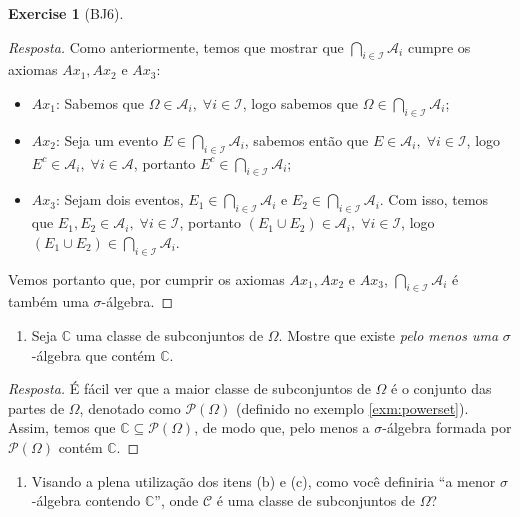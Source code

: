 \documentclass[
]{article}
\providecommand{\tightlist}{%
  \setlength{\itemsep}{0pt}\setlength{\parskip}{0pt}}
\theoremstyle{definition}
\theoremstyle{definition}
\theoremstyle{definition}
\newtheorem{exercise}{Exercise}[section]
\theoremstyle{definition}
\theoremstyle{remark}
\begin{document}
\begin{exercise}[BJ6]
\begin{proof}[Resposta]
Como anteriormente, temos que mostrar que \(\bigcap_{i \in \mathcal{I}}\mathcal{A}_{i}\) cumpre os axiomas \(Ax_{1}, Ax_{2}\) e \(Ax_{3}\):

\begin{itemize}
\tightlist
\item
  \(Ax_{1}\): Sabemos que \(\Omega \in \mathcal{A}_{i}, \; \forall i \in \mathcal{I}\), logo sabemos que \(\Omega \in \bigcap_{i \in \mathcal{I}}\mathcal{A}_{i}\);
\item
  \(Ax_{2}\): Seja um evento \(E \in \bigcap_{i \in \mathcal{I}}\mathcal{A}_{i}\), sabemos então que \(E \in \mathcal{A}_{i}, \; \forall i \in \mathcal{I}\), logo \(E^{c} \in \mathcal{A}_{i}, \; \forall i \in \mathcal{A}\), portanto \(E^{c} \in \bigcap_{i \in \mathcal{I}}\mathcal{A}_{i}\);
\item
  \(Ax_{3}\): Sejam dois eventos, \(E_{1} \in \bigcap_{i \in \mathcal{I}}\mathcal{A}_{i}\) e \(E_{2} \in \bigcap_{i \in \mathcal{I}}\mathcal{A}_{i}\). Com isso, temos que \(E_{1}, E_{2} \in \mathcal{A}_{i}, \; \forall i \in \mathcal{I}\), portanto \((E_{1} \cup E_{2}) \in \mathcal{A}_{i}, \; \forall i \in \mathcal{I}\), logo \((E_{1} \cup E_{2}) \in \bigcap_{i \in \mathcal{I}}\mathcal{A}_{i}\).
\end{itemize}

Vemos portanto que, por cumprir os axiomas \(Ax_{1}, Ax_{2}\) e \(Ax_{3}\), \(\bigcap_{i \in \mathcal{I}}\mathcal{A}_{i}\) é também uma \(\sigma\)-álgebra.
\end{proof}

\begin{enumerate}
\def\labelenumi{\alph{enumi})}
\setcounter{enumi}{2}
\tightlist
\item
  Seja \(\mathbb{C}\) uma classe de subconjuntos de \(\Omega\). Mostre que existe \emph{pelo menos uma} \(\sigma\)-álgebra que contém \(\mathbb{C}\).
\end{enumerate}

\begin{proof}[Resposta]
É fácil ver que a maior classe de subconjuntos de \(\Omega\) é o conjunto das partes de \(\Omega\), denotado como \(\mathcal{P}(\Omega)\) (definido no exemplo \ref{exm:powerset}). Assim, temos que \(\mathbb{C} \subseteq \mathcal{P}(\Omega)\), de modo que, pelo menos a \(\sigma\)-álgebra formada por \(\mathcal{P}(\Omega)\) contém \(\mathbb{C}\).
\end{proof}

\begin{enumerate}
\def\labelenumi{\alph{enumi})}
\setcounter{enumi}{3}
\tightlist
\item
  Visando a plena utilização dos itens (b) e (c), como você definiria ``a menor \(\sigma\)-álgebra contendo \(\mathbb{C}\)'', onde \(\mathcal{C}\) é uma classe de subconjuntos de \(\Omega\)?
\end{enumerate}


\end{exercise}
\end{document}
